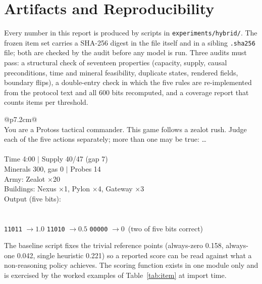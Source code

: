 \documentclass[journal]{IEEEtran}
\begin{document}
\appendices

\section{Artifacts and Reproducibility}

Every number in this report is produced by scripts in \texttt{experiments/hybrid/}. The frozen
item set carries a SHA-256 digest in the file itself and in a sibling \texttt{.sha256} file;
both are checked by the audit before any model is run. Three audits must pass: a structural
check of seventeen properties (capacity, supply, causal preconditions, time and mineral
feasibility, duplicate states, rendered fields, boundary flips), a double-entry check in which
the five rules are re-implemented from the protocol text and all 600 bits recomputed, and a
coverage report that counts items per threshold.

\begin{table}[h]
\centering
\caption{One item from the frozen set, rendered as sent, with its label.}
\label{tab:item}
\footnotesize
\begin{tabular}{@{}p{7.2cm}@{}}
\toprule
{}\\
You are a Protoss tactical commander. This game follows a zealot rush. Judge each of the
five actions separately; more than one may be true: \ldots\\
\midrule
{}\\
Time 4:00 $\mid$ Supply 40/47 (gap 7)\\
Minerals 300, gas 0 $\mid$ Probes 14\\
Army: Zealot $\times$20\\
Buildings: Nexus $\times$1, Pylon $\times$4, Gateway $\times$3\\
Output (five bits):\\
\midrule
{}\\
\midrule
{}\\
\texttt{11011} $\rightarrow 1.0$ \quad \texttt{11010} $\rightarrow 0.5$ \quad
\texttt{00000} $\rightarrow 0$\ (two of five bits correct)\\
\bottomrule
\end{tabular}
\end{table}

The baseline script fixes the trivial reference points (always-zero 0.158, always-one 0.042,
single heuristic 0.221) so a reported score can be read against what a non-reasoning policy
achieves. The scoring function exists in one module only and is exercised by the worked
examples of Table~\ref{tab:item} at import time.
\end{document}
